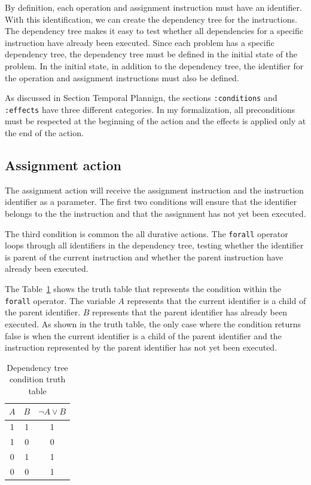 \documentclass[letterpaper]{article}
\begin{document}

By definition, each operation and assignment instruction must have an identifier. With this identification, we can create the dependency tree for the instructions. The dependency tree makes it easy to test whether all dependencies for a specific instruction have already been executed. Since each problem has a specific dependency tree, the dependency tree must be defined in the initial state of the problem. In the initial state, in addition to the dependency tree, the identifier for the operation and assignment instructions must also be defined.

As discussed in Section Temporal Plannign, the sections \texttt{:conditions} and \texttt{:effects} have three different categories. In my formalization, all preconditions must be respected at the beginning of the action and the effects is applied only at the end of the action.

\subsection{Assignment action}

The assignment action will receive the assignment instruction and the instruction identifier as a parameter. The first two conditions will ensure that the identifier belongs to the the instruction and that the assignment has not yet been executed.

The third condition is common the all durative actions. The \texttt{forall} operator loops through all identifiers in the dependency tree, testing whether the identifier is parent of the current instruction and whether the parent instruction have already been executed.

The Table~\ref{table:forall-truth-table} shows the truth table that represents the condition within the \texttt{forall} operator. The variable $A$ represents that the current identifier is a child of the parent identifier. $B$ represents that the parent identifier has already been executed. As shown in the truth table, the only case where the condition returns false is when the current identifier is a child of the parent identifier and the instruction represented by the parent identifier has not yet been executed.

\begin{table}[h]
    \centering
    \begin{tabular}{|c|c|c|}
        \hline
        $A$ & $B$ & $\neg A \lor B$ \\
        \hline
        1   & 1   & 1               \\
        1   & 0   & 0               \\
        0   & 1   & 1               \\
        0   & 0   & 1               \\
        \hline
    \end{tabular}
    \caption{Dependency tree condition truth table}
    \label{table:forall-truth-table}
\end{table}
\end{document}

